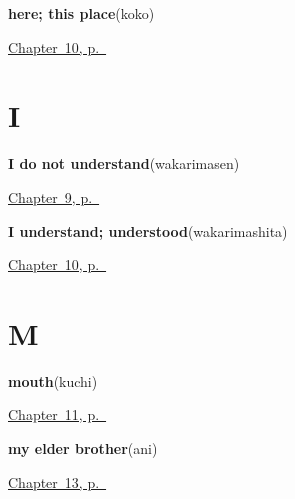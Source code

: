 \noindent\begin{minipage}[t]{\linewidth}
\raggedright
\textbf{here; this place}\enspace\emph{}\enspace(koko)\par
\footnotesize \hyperref[ch:ja-slower-please]{Chapter~10, p.~\pageref*{ch:ja-slower-please}}
\end{minipage}\par\smallskip

\section*{I}

\noindent\begin{minipage}[t]{\linewidth}
\raggedright
\textbf{I do not understand}\enspace\emph{}\enspace(wakarimasen)\par
\footnotesize \hyperref[ch:ja-repeat-please]{Chapter~9, p.~\pageref*{ch:ja-repeat-please}}
\end{minipage}\par\smallskip

\noindent\begin{minipage}[t]{\linewidth}
\raggedright
\textbf{I understand; understood}\enspace\emph{}\enspace(wakarimashita)\par
\footnotesize \hyperref[ch:ja-slower-please]{Chapter~10, p.~\pageref*{ch:ja-slower-please}}
\end{minipage}\par\smallskip

\section*{M}

\noindent\begin{minipage}[t]{\linewidth}
\raggedright
\textbf{mouth}\enspace\emph{}\enspace(kuchi)\par
\footnotesize \hyperref[ch:ja-body-seven]{Chapter~11, p.~\pageref*{ch:ja-body-seven}}
\end{minipage}\par\smallskip

\noindent\begin{minipage}[t]{\linewidth}
\raggedright
\textbf{my elder brother}\enspace\emph{}\enspace(ani)\par
\footnotesize \hyperref[ch:ja-family-nine]{Chapter~13, p.~\pageref*{ch:ja-family-nine}}
\end{minipage}\par\smallskip

